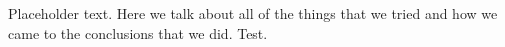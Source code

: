 Placeholder text. Here we talk about all of the things that we tried and how we came to the conclusions that we did. Test.
